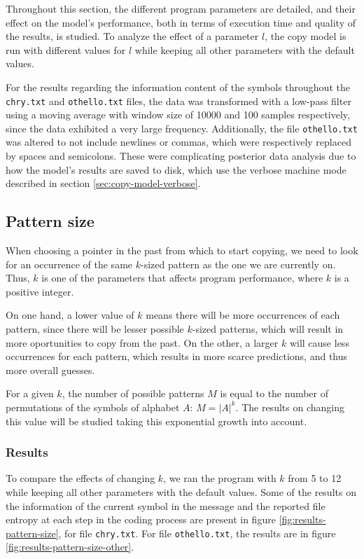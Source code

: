 \documentclass{article}
\begin{document}
Throughout this section, the different program parameters are detailed, and their effect on the model's performance, both in terms of execution time and quality of the results, is studied.
To analyze the effect of a parameter $l$, the copy model is run with different values for $l$ while keeping all other parameters with the default values.

For the results regarding the information content of the symbols throughout the \verb|chry.txt| and \verb|othello.txt| files, the data was transformed with a low-pass filter using a moving average with window size of 10000 and 100 samples respectively, since the data exhibited a very large frequency.
Additionally, the file \verb|othello.txt| was altered to not include newlines or commas, which were respectively replaced by spaces and semicolons.
These were complicating posterior data analysis due to how the model's results are saved to disk, which use the verbose machine mode described in section \ref{sec:copy-model-verbose}.

\subsection{Pattern size}

When choosing a pointer in the past from which to start copying, we need to look for an occurrence of the same $k$-sized pattern as the one we are currently on.
Thus, $k$ is one of the parameters that affects program performance, where $k$ is a positive integer.

On one hand, a lower value of $k$ means there will be more occurrences of each pattern, since there will be lesser possible $k$-sized patterns, which will result in more oportunities to copy from the past.
On the other, a larger $k$ will cause less occurrences for each pattern, which results in more scarce predictions, and thus more overall guesses.

For a given $k$, the number of possible patterns $M$ is equal to the number of permutations of the symbols of alphabet $A$: $M = \vert A \vert ^ k$.
The results on changing this value will be studied taking this exponential growth into account.

\subsubsection{Results}

To compare the effects of changing $k$, we ran the program with $k$ from 5 to 12 while keeping all other parameters with the default values.
Some of the results on the information of the current symbol in the message and the reported file entropy at each step in the coding process are
present in figure \ref{fig:results-pattern-size}, for file \verb|chry.txt|.
For file \verb|othello.txt|, the results are in figure \ref{fig:results-pattern-size-other}.
\end{document}
